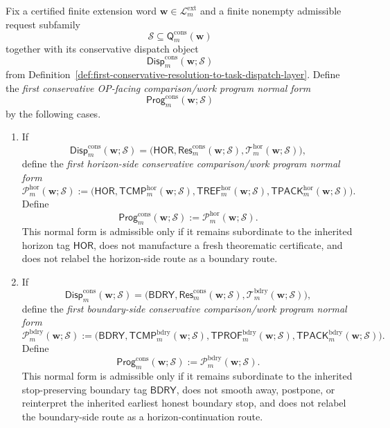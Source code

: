 \begin{definition}
\label{def:first-conservative-op-facing-comparison-work-program-normal-form}
Fix a certified finite extension word \(\mathbf w\in\mathcal L^{\mathrm{ext}}_{m}\) and a finite nonempty admissible request subfamily
\[
  \mathcal S \subseteq \mathsf{Q}^{\mathrm{cons}}_{m}(\mathbf w)
\]
together with its conservative dispatch object
\[
  \mathsf{Disp}^{\mathrm{cons}}_{m}(\mathbf w;\mathcal S)
\]
from Definition~\ref{def:first-conservative-resolution-to-task-dispatch-layer}. Define the \emph{first conservative OP-facing comparison/work program normal form}
\[
  \mathsf{Prog}^{\mathrm{cons}}_{m}(\mathbf w;\mathcal S)
\]
by the following cases.
\begin{enumerate}[label=(\roman*)]
  \item If
  \[
    \mathsf{Disp}^{\mathrm{cons}}_{m}(\mathbf w;\mathcal S)
    =
    \bigl(\mathsf{HOR},\mathsf{Res}^{\mathrm{cons}}_{m}(\mathbf w;\mathcal S),\mathcal T^{\mathrm{hor}}_{m}(\mathbf w;\mathcal S)\bigr),
  \]
  define the \emph{first horizon-side conservative comparison/work program normal form}
  \[
    \mathcal P^{\mathrm{hor}}_{m}(\mathbf w;\mathcal S)
    :=
    \bigl(
      \mathsf{HOR},
      \mathsf{TCMP}^{\mathrm{hor}}_{m}(\mathbf w;\mathcal S),
      \mathsf{TREF}^{\mathrm{hor}}_{m}(\mathbf w;\mathcal S),
      \mathsf{TPACK}^{\mathrm{hor}}_{m}(\mathbf w;\mathcal S)
    \bigr).
  \]
  Define
  \[
    \mathsf{Prog}^{\mathrm{cons}}_{m}(\mathbf w;\mathcal S)
    :=
    \mathcal P^{\mathrm{hor}}_{m}(\mathbf w;\mathcal S).
  \]
  This normal form is admissible only if it remains subordinate to the inherited horizon tag \(\mathsf{HOR}\), does not manufacture a fresh theorematic certificate, and does not relabel the horizon-side route as a boundary route.

  \item If
  \[
    \mathsf{Disp}^{\mathrm{cons}}_{m}(\mathbf w;\mathcal S)
    =
    \bigl(\mathsf{BDRY},\mathsf{Res}^{\mathrm{cons}}_{m}(\mathbf w;\mathcal S),\mathcal T^{\mathrm{bdry}}_{m}(\mathbf w;\mathcal S)\bigr),
  \]
  define the \emph{first boundary-side conservative comparison/work program normal form}
  \[
    \mathcal P^{\mathrm{bdry}}_{m}(\mathbf w;\mathcal S)
    :=
    \bigl(
      \mathsf{BDRY},
      \mathsf{TCMP}^{\mathrm{bdry}}_{m}(\mathbf w;\mathcal S),
      \mathsf{TPROF}^{\mathrm{bdry}}_{m}(\mathbf w;\mathcal S),
      \mathsf{TPACK}^{\mathrm{bdry}}_{m}(\mathbf w;\mathcal S)
    \bigr).
  \]
  Define
  \[
    \mathsf{Prog}^{\mathrm{cons}}_{m}(\mathbf w;\mathcal S)
    :=
    \mathcal P^{\mathrm{bdry}}_{m}(\mathbf w;\mathcal S).
  \]
  This normal form is admissible only if it remains subordinate to the inherited stop-preserving boundary tag \(\mathsf{BDRY}\), does not smooth away, postpone, or reinterpret the inherited earliest honest boundary stop, and does not relabel the boundary-side route as a horizon-continuation route.
\end{enumerate}
\end{definition}

